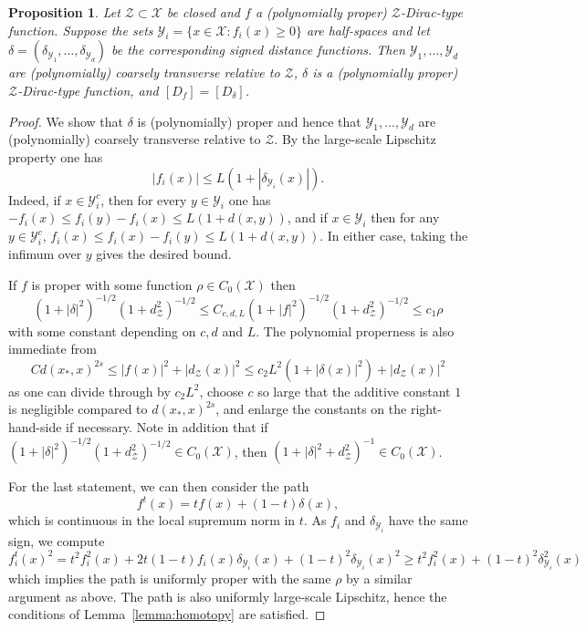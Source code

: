 \documentclass[12pt]{amsart}
\newtheorem{proposition}[theorem]{Proposition}
\newcommand{\Xx}{{\mathcal X}}
\newcommand{\Yy}{{\mathcal Y}}
\newcommand{\Zz}{{\mathcal Z}}
\begin{document}
\begin{proposition}
Let $\Zz \subset \Xx$ be closed and $f$ a (polynomially proper) $\Zz$-Dirac-type function. Suppose the sets $\Yy_i=\{x\in \Xx: f_i(x)\geq 0\}$ are half-spaces and let $\delta=(\delta_{\Yy_1},\ldots,\delta_{\Yy_d})$ be the corresponding signed distance functions. Then $\Yy_1,\dots, \Yy_d$ are (polynomially) coarsely transverse relative to $\Zz$, $\delta$ is a  (polynomially proper) $\Zz$-Dirac-type function, and $[D_f]=[D_\delta]$.
\end{proposition}
\begin{proof}
We show that $\delta$ is (polynomially) proper and hence that $\Yy_1,\dots, \Yy_d$ are (polynomially) coarsely transverse relative to $\Zz$. By the large-scale Lipschitz property one has
$$|f_i(x)|\leq L(1+|\delta_{\Yy_i}(x)|).$$
Indeed, if $x \in \Yy_i^c$, then for every $y\in \Yy_i$ one has $-f_i(x)\leq f_i(y)-f_i(x)\leq L(1+d(x,y))$, and if $x \in \Yy_i$ then for any $y \in \Yy_i^c$, $f_i(x)\leq f_i(x)-f_i(y)\leq L(1+d(x,y))$.
In either case, taking the infimum over $y$ gives the desired bound.

If $f$ is proper with some function $\rho\in C_0(\Xx)$ then 
\[(1+|\delta|^2)^{-1/2}(1+d_{\Zz}^2)^{-1/2}\leq C_{c,d,L}(1+|f|^2)^{-1/2}(1+d_{\Zz}^2)^{-1/2}\leq c_1 \rho\]
with some constant depending on $c,d$ and $L$. The polynomial properness is also immediate from 
\[Cd(x_*,x)^{2s} \leq |f(x)|^2 + |d_{\Zz}(x)|^2 \leq c_2 L^2 (1+|\delta(x)|^2) + |d_{\Zz}(x)|^2\]
as one can divide through by $c_2L^2$, choose $c$ so large that the additive constant $1$ is negligible compared to $d(x_*,x)^{2s}$, and enlarge the constants on the right-hand-side if necessary.
Note in addition that if $(1+|\delta|^2)^{-1/2}(1+d_\Zz^2)^{-1/2} \in C_0(\Xx)$, then $(1+|\delta|^2 + d_\Zz^2)^{-1} \in C_0(\Xx)$.


For the last statement, we can then consider the path
$$f^t(x)= t f(x) + (1-t)\delta(x),$$
which is continuous in the local supremum norm in $t$.
As $f_i$ and $\delta_{\Yy_i}$ have the same sign, we compute
$$f_i^t(x)^2 = t^2 f^2_i(x) +2 t(1-t) f_i(x)\delta_{\Yy_i}(x) + (1-t)^2\delta_{\Yy_i}(x)^2\geq t^2 f_i^2(x) + (1-t)^2\delta^2_{\Yy_i}(x)$$
which implies the path is uniformly proper with the same $\rho$ by a similar argument as above. 
The path is also uniformly large-scale Lipschitz, hence the conditions of Lemma~\ref{lemma:homotopy} are satisfied.


\end{proof}
\end{document}
